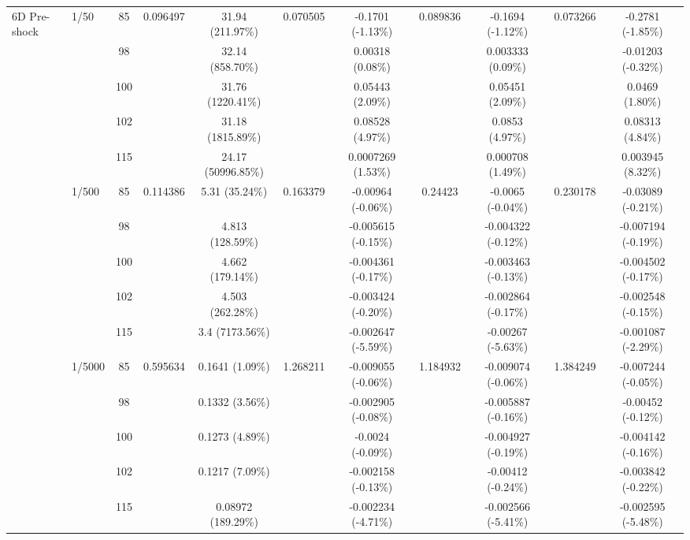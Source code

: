 \begin{table}[htbp]
{\begin{tabular}{llccccccccc}
\multirow{15}{*}{6D Pre-shock}
& \multirow{5}{*}{1/50} & 85 & \multirow{5}{*}{0.096497} & 31.94 (211.97\%) & \multirow{5}{*}{0.070505} & -0.1701 (-1.13\%) & \multirow{5}{*}{0.089836} & -0.1694 (-1.12\%) & \multirow{5}{*}{0.073266} & -0.2781 (-1.85\%) \\
& & 98 & & 32.14 (858.70\%) & & 0.00318 (0.08\%) & & 0.003333 (0.09\%) & & -0.01203 (-0.32\%) \\
& & 100 & & 31.76 (1220.41\%) & & 0.05443 (2.09\%) & & 0.05451 (2.09\%) & & 0.0469 (1.80\%) \\
& & 102 & & 31.18 (1815.89\%) & & 0.08528 (4.97\%) & & 0.0853 (4.97\%) & & 0.08313 (4.84\%) \\
& & 115 & & 24.17 (50996.85\%) & & 0.0007269 (1.53\%) & & 0.000708 (1.49\%) & & 0.003945 (8.32\%) \\
\cmidrule(lr){2-11}
& \multirow{5}{*}{1/500} & 85 & \multirow{5}{*}{0.114386} & 5.31 (35.24\%) & \multirow{5}{*}{0.163379} & -0.00964 (-0.06\%) & \multirow{5}{*}{0.24423} & -0.0065 (-0.04\%) & \multirow{5}{*}{0.230178} & -0.03089 (-0.21\%) \\
& & 98 & & 4.813 (128.59\%) & & -0.005615 (-0.15\%) & & -0.004322 (-0.12\%) & & -0.007194 (-0.19\%) \\
& & 100 & & 4.662 (179.14\%) & & -0.004361 (-0.17\%) & & -0.003463 (-0.13\%) & & -0.004502 (-0.17\%) \\
& & 102 & & 4.503 (262.28\%) & & -0.003424 (-0.20\%) & & -0.002864 (-0.17\%) & & -0.002548 (-0.15\%) \\
& & 115 & & 3.4 (7173.56\%) & & -0.002647 (-5.59\%) & & -0.00267 (-5.63\%) & & -0.001087 (-2.29\%) \\
\cmidrule(lr){2-11}
& \multirow{5}{*}{1/5000} & 85 & \multirow{5}{*}{0.595634} & 0.1641 (1.09\%) & \multirow{5}{*}{1.268211} & -0.009055 (-0.06\%) & \multirow{5}{*}{1.184932} & -0.009074 (-0.06\%) & \multirow{5}{*}{1.384249} & -0.007244 (-0.05\%) \\
& & 98 & & 0.1332 (3.56\%) & & -0.002905 (-0.08\%) & & -0.005887 (-0.16\%) & & -0.00452 (-0.12\%) \\
& & 100 & & 0.1273 (4.89\%) & & -0.0024 (-0.09\%) & & -0.004927 (-0.19\%) & & -0.004142 (-0.16\%) \\
& & 102 & & 0.1217 (7.09\%) & & -0.002158 (-0.13\%) & & -0.00412 (-0.24\%) & & -0.003842 (-0.22\%) \\
& & 115 & & 0.08972 (189.29\%) & & -0.002234 (-4.71\%) & & -0.002566 (-5.41\%) & & -0.002595 (-5.48\%) \\
\midrule


\end{tabular}}
\end{table}

